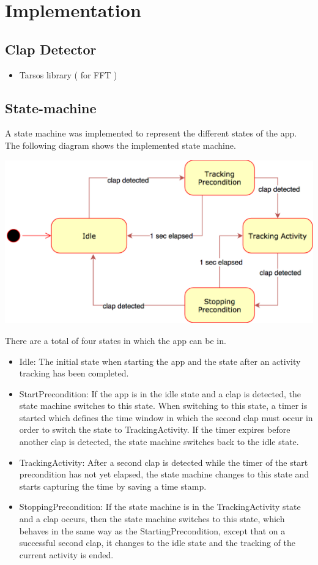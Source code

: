 \documentclass
[
 12pt, %
       DIV12,
       a4paper,
       oneside,
       titlepage,
       parskip=half,
       headings=normal,
       listof=totoc,
       bibliography=totoc,
       index=totoc,
       captions=tableheading,
       ]{scrreprt}
\begin{document}
\section{Implementation}
\label{sec:org7c927b3}
\subsection{Clap Detector}
\label{sec:orgaf5a63b}
\begin{itemize}
\item Tarsos library ( for FFT )
\end{itemize}
\subsection{State-machine}
\label{sec:orgd3a5b2d}
A state machine was implemented to represent the different states of the app.
The following diagram shows the implemented state machine.

\begin{center}
\includegraphics[width=.9\linewidth]{./imgs/statemachine.png}
\end{center}

There are a total of four states in which the app can be in. 
\begin{itemize}
\item Idle: The initial state when starting the app and the state after an activity tracking has been completed.
\item StartPrecondition: If the app is in the idle state and a clap is detected, the state machine switches to this state. When switching to this state, a timer is started which defines the time window in which the second clap must occur in order to switch the state to TrackingActivity. If the timer expires before another clap is detected, the state machine switches back to the idle state.
\item TrackingActivity: After a second clap is detected while the timer of the start precondition has not yet elapsed, the state machine changes to this state and starts capturing the time by saving a time stamp.
\item StoppingPrecondition: If the state machine is in the TrackingActivity state and a clap occurs, then the state machine switches to this state, which behaves in the same way as the StartingPrecondition, except that on a successful second clap, it changes to the idle state and the tracking of the current activity is ended.
\end{itemize}
\end{document}
